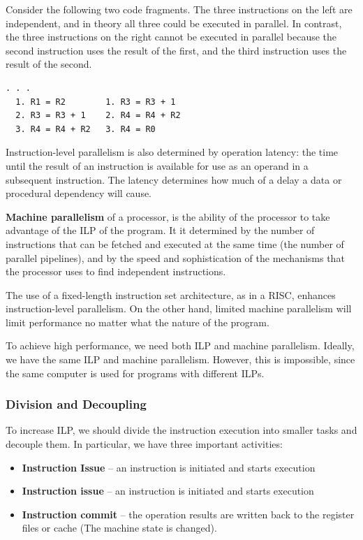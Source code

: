 Consider the following two code fragments. The three instructions on the left are independent, and in theory all three could be executed in parallel. In contrast, the three instructions on the right cannot be executed in parallel because the second instruction uses the result of the first, and the third instruction uses the result of the second.
\begin{lstlisting}[frame=single]  % Start your code-block
  . . .
  1. R1 = R2		1. R3 = R3 + 1
  2. R3 = R3 + 1	2. R4 = R4 + R2
  3. R4 = R4 + R2	3. R4 = R0
\end{lstlisting}

Instruction-level parallelism is also determined by operation latency: the time until the result of an instruction is available for use as an operand in a subsequent instruction. The latency determines how much of a delay a data or procedural dependency will cause.

\textbf{Machine parallelism} of a processor, is the ability of the processor to take advantage of the ILP of the program. It it determined by the number of instructions that can be fetched and executed at the same time (the number of parallel pipelines), and by the speed and sophistication of the mechanisms that the processor uses to find independent instructions.

The use of a fixed-length instruction set architecture, as in a RISC, enhances instruction-level parallelism. On the other hand, limited machine parallelism will limit performance no matter what the nature of the program.

To achieve high performance, we need both ILP and machine parallelism. Ideally, we have the same ILP and machine parallelism. However, this is impossible, since the same computer is used for programs with different ILPs. 

\subsubsection{Division and Decoupling}
To increase ILP, we should divide the instruction execution into smaller tasks and decouple them. In particular, we have three important activities:
\begin{itemize}
\item \textbf{Instruction Issue} -- an instruction is initiated and starts execution
\item \textbf{Instruction issue} -- an instruction is initiated and starts execution
\item \textbf{Instruction commit} -- the operation results are written back to the register files or cache (The machine state is changed).
\end{itemize}


